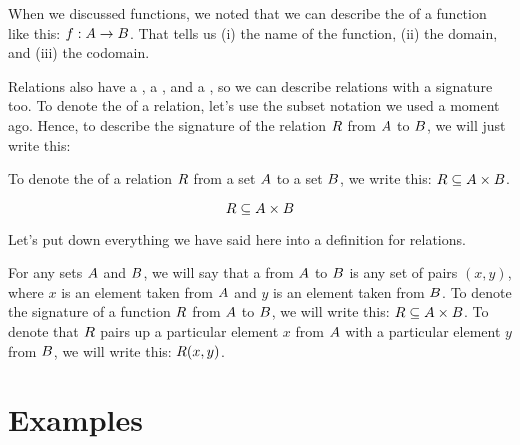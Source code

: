 \documentclass[../../../main.tex]{subfiles}
\begin{document}
When we discussed functions, we noted that we can describe the  of a function like this: $f: A \rightarrow B$. That tells us (i) the name of the function, (ii) the domain, and (iii) the codomain.

Relations also have a , a , and a , so we can describe relations with a signature too. To denote the  of a relation, let's use the subset notation we used a moment ago. Hence, to describe the signature of the relation $R$ from $A$ to $B$, we will just write this:

\begin{aside}
  \begin{notation}
    To denote the  of a relation $R$ from a set $A$ to a set $B$, we write this: $R \subseteq A \times B$.
  \end{notation}
\end{aside}

\begin{equation*}
  R \subseteq A \times B
\end{equation*}

Let's put down everything we have said here into a definition for relations.

\begin{fdefinition}[Relations]
  \label{def:relations}
  For any sets $A$ and $B$, we will say that a  from $A$ to $B$ is any set of pairs $(x, y)$, where $x$ is an element taken from $A$ and $y$ is an element taken from $B$. To denote the signature of a function $R$ from $A$ to $B$, we will write this: $R \subseteq A \times B$. To denote that $R$ pairs up a particular element $x$ from $A$ with a particular element $y$ from $B$, we will write this: $R(x, y)$.
\end{fdefinition}

\section{Examples}
\end{document}
